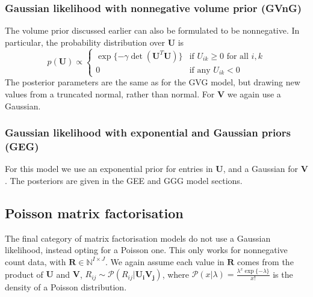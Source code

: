 \documentclass{article}
\newcommand{\R}{\boldsymbol R}
\newcommand{\U}{\boldsymbol U}
\newcommand{\Ui}{\boldsymbol{U_i}}
\newcommand{\V}{\boldsymbol V}
\newcommand{\Vj}{\boldsymbol{V_j}}
\begin{document}
		\subsubsection{Gaussian likelihood with nonnegative volume prior (GVnG)}
		The volume prior discussed earlier can also be formulated to be nonnegative. In particular, the probability distribution over $\U$ is
		\begin{equation*}
			p ( \U ) \propto \left\{
			\begin{array}{ll}
			\displaystyle \exp \lbrace - \gamma \det (\U^T \U) \rbrace   & \mbox{if } U_{ik} \geq 0 \mbox{ for all $i, k$} \\
			0 & \mbox{if any } U_{ik} < 0
			\end{array}
			\right.
		\end{equation*}
		The posterior parameters are the same as for the GVG model, but drawing new values from a truncated normal, rather than normal. For $\V$ we again use a Gaussian.
		
		\subsubsection{Gaussian likelihood with exponential and Gaussian priors (GEG)}
			For this model we use an exponential prior for entries in $\U$, and a Gaussian for $\V$. The posteriors are given in the GEE and GGG model sections.
		
		
		\subsection{Poisson matrix factorisation}
		The final category of matrix factorisation models do not use a Gaussian likelihood, instead opting for a Poisson one. This only works for nonnegative count data, with $ \R \in \mathbb{N}^{I \times J} $. We again assume each value in $\R$ comes from the product of $\U$ and $\V$, $ R_{ij} \sim \mathcal{P} (R_{ij} | \Ui \Vj )$, where $ \mathcal{P} (x|\lambda) = \frac{\lambda^x \exp \lbrace - \lambda \rbrace}{x!} $ is the density of a Poisson distribution. 
		
\end{document}
